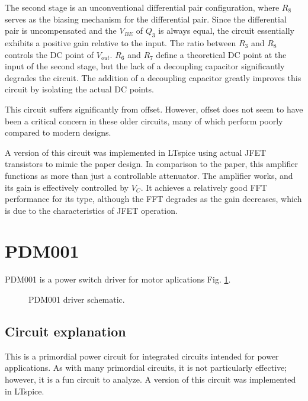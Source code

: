 \documentclass[12pt]{article}
\begin{document}
The second stage is an unconventional differential pair configuration, where $R_8$ serves as the biasing mechanism for the differential pair. Since the differential pair is uncompensated and the $V_{BE}$ of $Q_3$ is always equal, the circuit essentially exhibits a positive gain relative to the input. The ratio between $R_3$ and $R_8$ controls the DC point of $V_{out}$. $R_6$ and $R_7$ define a theoretical DC point at the input of the second stage, but the lack of a decoupling capacitor significantly degrades the circuit. The addition of a decoupling capacitor greatly improves this circuit by isolating the actual DC points.

This circuit suffers significantly from offset. However, offset does not seem to have been a critical concern in these older circuits, many of which perform poorly compared to modern designs.  

A version of this circuit was implemented in LTspice using actual JFET transistors to mimic the paper design. In comparison to the paper, this amplifier functions as more than just a controllable attenuator. The amplifier works, and its gain is effectively controlled by $V_C$. It achieves a relatively good FFT performance for its type, although the FFT degrades as the gain decreases, which is due to the characteristics of JFET operation.




\newpage




\section{PDM001}


PDM001 is a power switch driver for motor aplications Fig. \ref{PDM001}. 

\begin{figure}[H]
        \centering
        
        \caption{PDM001 driver schematic.}
        \label{PDM001}
\end{figure}


\subsection{Circuit explanation}

This is a primordial power circuit for integrated circuits intended for power applications. As with many primordial circuits, it is not particularly effective; however, it is a fun circuit to analyze.  
A version of this circuit was implemented in LTspice.  
\end{document}
